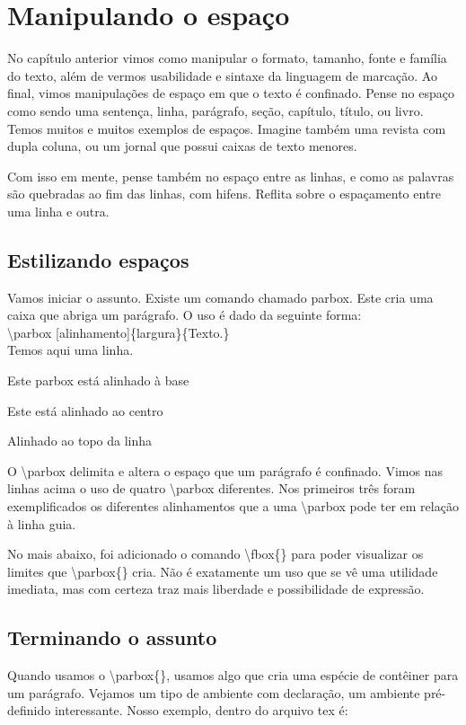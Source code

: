 \chapter{Manipulando o espaço}
No capítulo anterior vimos como manipular o formato, tamanho, fonte e família do texto,
além de vermos usabilidade e sintaxe da linguagem de marcação.
Ao final, vimos manipulações de espaço em que o texto é confinado.
Pense no espaço como sendo uma sentença, linha, parágrafo, seção,
capítulo, título, ou livro.
Temos muitos e muitos exemplos de espaços.
Imagine também uma revista com dupla coluna,
ou um jornal que possui caixas de texto menores.

Com isso em mente, pense também no espaço entre as linhas,
e como as palavras são quebradas ao fim das linhas, com hifens.
Reflita sobre o espaçamento entre uma linha e outra.

\section{Estilizando espaços}
Vamos iniciar o assunto.
Existe um comando chamado parbox.
Este cria uma caixa que abriga um parágrafo.
O uso é dado da seguinte forma:\\
\textbackslash parbox [alinhamento]\{largura\}\{Texto.\}
\\

Temos aqui uma linha.
\quad\parbox[b]{2.5cm}{Este parbox está alinhado à base}
\quad\parbox{2.5cm}{Este está alinhado ao centro}
\quad\parbox[t]{2.5cm}{Alinhado ao topo da linha}


O \textbackslash parbox delimita e altera o espaço que um parágrafo é confinado.
Vimos nas linhas acima o uso de quatro \textbackslash parbox diferentes.
Nos primeiros três foram exemplificados os diferentes alinhamentos que a uma \textbackslash parbox pode ter em relação à linha guia.

No mais abaixo, foi adicionado o comando \textbackslash fbox\{\}
para poder visualizar os limites que \textbackslash parbox\{\} cria.
Não é exatamente um uso que se vê uma utilidade imediata,
mas com certeza traz mais liberdade e possibilidade de expressão.

\section{Terminando o assunto}
Quando usamos o \textbackslash parbox\{\}, usamos algo que cria uma espécie de contêiner para um parágrafo.
Vejamos um tipo de ambiente com declaração, um ambiente pré-definido interessante.
Nosso exemplo, dentro do arquivo tex é:

